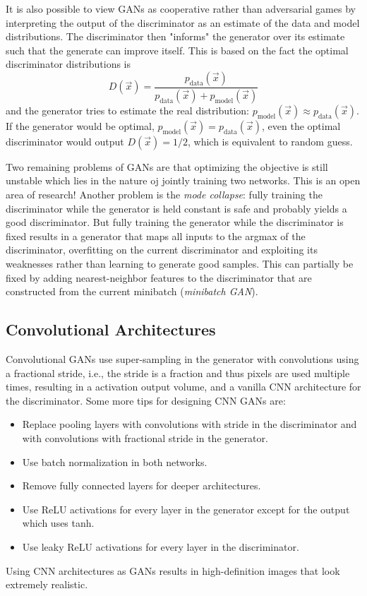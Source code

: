 
			It is also possible to view GANs as cooperative rather than adversarial games by interpreting the output of the discriminator as an estimate of the data and model distributions. The discriminator then "informs" the generator over its estimate such that the generate can improve itself. This is based on the fact the optimal discriminator distributions is
			\begin{equation}
				D(\vec{x}) = \frac{p_\mathrm{data}(\vec{x})}{p_\mathrm{data}(\vec{x}) + p_\mathrm{model}(\vec{x})}
			\end{equation}
			and the generator tries to estimate the real distribution: \( p_\mathrm{model}(\vec{x}) \approx p_\mathrm{data}(\vec{x}) \). If the generator would be optimal, \( p_\mathrm{model}(\vec{x}) = p_\mathrm{data}(\vec{x}) \), even the optimal discriminator would output \( D(\vec{x}) = 1/2 \), which is equivalent to random guess.

			Two remaining problems of GANs are that optimizing the objective is still unstable which lies in the nature oj jointly training two networks. This is an open area of research! Another problem is the \emph{mode collapse}: fully training the discriminator while the generator is held constant is safe and probably yields a good discriminator. But fully training the generator while the discriminator is fixed results in a generator that maps all inputs to the argmax of the discriminator, overfitting on the current discriminator and exploiting its weaknesses rather than learning to generate good samples. This can partially be fixed by adding nearest-neighbor features to the discriminator that are constructed from the current minibatch (\emph{minibatch GAN}).

		\subsection{Convolutional Architectures}
			Convolutional GANs use super-sampling in the generator with convolutions using a fractional stride, i.e., the stride is a fraction and thus pixels are used multiple times, resulting in a activation output volume, and a vanilla CNN architecture for the discriminator. Some more tips for designing CNN GANs are:
			\begin{itemize}
				\item Replace pooling layers with convolutions with stride in the discriminator and with convolutions with fractional stride in the generator.
				\item Use batch normalization in both networks.
				\item Remove fully connected layers for deeper architectures.
				\item Use ReLU activations for every layer in the generator except for the output which uses tanh.
				\item Use leaky ReLU activations for every layer in the discriminator.
			\end{itemize}
			Using CNN architectures as GANs results in high-definition images that look extremely realistic.

